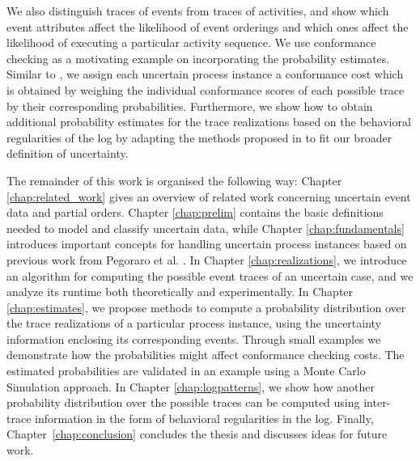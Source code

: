 We also distinguish traces of events from traces of activities, and show which event attributes affect the likelihood of event orderings and which ones affect the likelihood of executing a particular activity sequence.
We use conformance checking as a motivating example on incorporating the probability estimates.
Similar to \cite{por}, we assign each uncertain process instance a conformance cost which is obtained by weighing the individual conformance scores of each possible trace by their corresponding probabilities.
Furthermore, we show how to obtain additional probability estimates for the trace realizations based on the behavioral regularities of the log by adapting the methods proposed in \cite{por} to fit our broader definition of uncertainty.

The remainder of this work is organised the following way: Chapter \ref{chap:related_work} gives an overview of related work concerning uncertain event data and partial orders.
Chapter \ref{chap:prelim} contains the basic definitions needed to model and classify uncertain data, while Chapter \ref{chap:fundamentals} introduces important concepts for handling uncertain process instances based on previous work from Pegoraro et al. \citep{mining,discovery,efficient,conformance}.
In Chapter \ref{chap:realizations}, we introduce an algorithm for computing the possible event traces of an uncertain case, and we analyze its runtime both theoretically and experimentally.
In Chapter \ref{chap:estimates}, we propose methods to compute a probability distribution over the trace realizations of a particular process instance, using the uncertainty information enclosing its corresponding events.
Through small examples we demonstrate how the probabilities might affect conformance checking costs.
The estimated probabilities are validated in an example using a Monte Carlo Simulation approach.  
In Chapter \ref{chap:logpatterns}, we show how another probability distribution over the possible traces can be computed using inter-trace information in the form of behavioral regularities in the log.
Finally, \mbox{Chapter \ref{chap:conclusion}} concludes the thesis and discusses ideas for future work.




%
%
%
%
%
%
%
